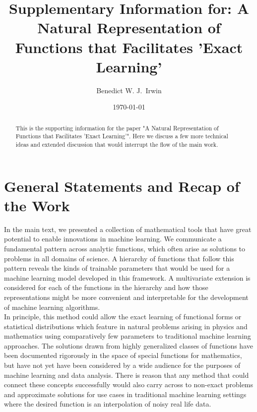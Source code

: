 \documentclass{article}
\title{Supplementary Information for: A Natural Representation of Functions that Facilitates 'Exact Learning'}
\date{\today}
\begin{document}

\author[1,2]{Benedict W. J.~Irwin}


\maketitle

\begin{abstract}
This is the supporting information for the paper "A Natural Representation of Functions that Facilitates 'Exact Learning'".
Here we discuss a few more technical ideas and extended discussion that would interrupt the flow of the main work.
\end{abstract}


\section{General Statements and Recap of the Work}
In the main text, we presented a collection of mathematical tools that have great potential to enable innovations in machine learning. We communicate a fundamental pattern across analytic functions, which often arise as solutions to problems in all domains of science. A hierarchy of functions that follow this pattern reveals the kinds of trainable parameters that would be used for a machine learning model developed in this framework. A multivariate extension is considered for each of the functions in the hierarchy and how those representations might be more convenient and interpretable for the development of machine learning algorithms. \\

In principle, this method could allow the exact learning of functional forms or statistical distributions which feature in natural problems arising in physics and mathematics using comparatively few parameters to traditional machine learning approaches. The solutions drawn from highly generalized classes of functions have been documented rigorously in the space of special functions for mathematics, but have not yet have been considered by a wide audience for the purposes of machine learning and data analysis. There is reason that any method that could connect these concepts successfully would also carry across to non-exact problems and approximate solutions for use cases in traditional machine learning settings where the desired function is an interpolation of noisy real life data.\\
\end{document}

